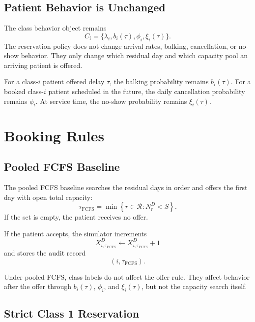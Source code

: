 \documentclass[11pt]{article}
\begin{document}
\subsection{Patient Behavior is Unchanged}

The class behavior object remains
\[
C_i=\{\lambda_i,b_i(\tau),\phi_i,\xi_i(\tau)\}.
\]
The reservation policy does not change arrival rates, balking, cancellation, or no-show behavior.
They only change which residual day and which capacity pool an arriving patient is offered.

\begin{keybox}[title={What the Reservation Strategy Does Not Change}]
For a class-\(i\) patient offered delay \(\tau\), the balking probability remains \(b_i(\tau)\).
For a booked class-\(i\) patient scheduled in the future, the daily cancellation probability remains
\(\phi_i\). At service time, the no-show probability remains \(\xi_i(\tau)\).
\end{keybox}

\section{Booking Rules}

\subsection{Pooled FCFS Baseline}

The pooled FCFS baseline searches the residual days in order and offers the first day with open total
capacity:
\[
\tau_{\mathrm{FCFS}}
=
\min\left\{r\in\mathcal R:N_r^D<S\right\}.
\]
If the set is empty, the patient receives no offer.

If the patient accepts, the simulator increments
\[
X_{i,\tau_{\mathrm{FCFS}}}^{D}
\leftarrow
X_{i,\tau_{\mathrm{FCFS}}}^{D}+1
\]
and stores the audit record
\[
(i,\tau_{\mathrm{FCFS}}).
\]

\begin{examplebox}[title={FCFS in One Line}]
Under pooled FCFS, class labels do not affect the offer rule. They affect behavior after the offer
through \(b_i(\tau)\), \(\phi_i\), and \(\xi_i(\tau)\), but not the capacity search itself.
\end{examplebox}

\subsection{Strict Class 1 Reservation}
\end{document}
